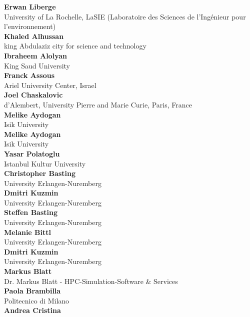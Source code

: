 \documentclass[article,A4,11pt]{llncs}%
\begin{document}
        \noindent
    {\bf Erwan Liberge}\\
    University of La Rochelle, LaSIE (Laboratoire des Sciences de l'Ingénieur pour l'environnement)\\
        \noindent
    {\bf Khaled Alhussan}\\
    king Abdulaziz city for science and technology\\
        \noindent
    {\bf Ibraheem Alolyan}\\
    King Saud University\\
        \noindent
    {\bf Franck Assous}\\
    Ariel University Center, Israel\\
        \noindent
    {\bf Joel Chaskalovic}\\
    d'Alembert,  University Pierre and Marie Curie, Paris, France\\
        \noindent
    {\bf Melike Aydogan}\\
    Isik University\\
        \noindent
    {\bf Melike Aydogan}\\
    Isik University\\
        \noindent
    {\bf Yasar Polatoglu}\\
    Istanbul Kultur University\\
        \noindent
    {\bf Christopher Basting}\\
    University Erlangen-Nuremberg\\
        \noindent
    {\bf Dmitri Kuzmin}\\
    University Erlangen-Nuremberg\\
        \noindent
    {\bf Steffen Basting}\\
    University Erlangen-Nuremberg\\
        \noindent
    {\bf Melanie Bittl}\\
    University Erlangen-Nuremberg\\
        \noindent
    {\bf Dmitri Kuzmin}\\
    University Erlangen-Nuremberg\\
        \noindent
    {\bf Markus Blatt}\\
    Dr. Markus Blatt - HPC-Simulation-Software \& Services\\
        \noindent
    {\bf Paola Brambilla}\\
    Politecnico di Milano\\
        \noindent
    {\bf Andrea Cristina}\\
\end{document}
